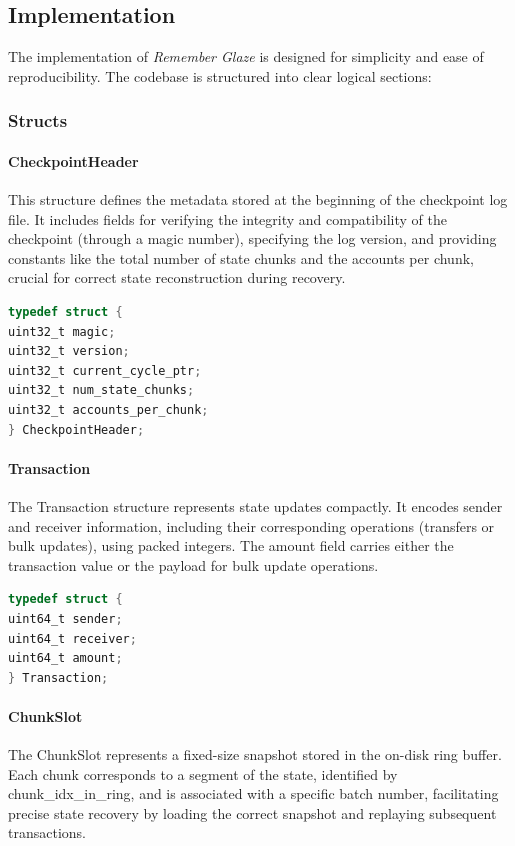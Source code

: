 \documentclass[conference]{IEEEtran}
\begin{document}
\subsection{Implementation}

The implementation of \textit{Remember Glaze} is designed for simplicity and ease of reproducibility. The codebase is structured into clear logical sections: 
\subsubsection{Structs}

\paragraph{CheckpointHeader}
This structure defines the metadata stored at the beginning of the checkpoint log file. It includes fields for verifying the integrity and compatibility of the checkpoint (through a magic number), specifying the log version, and providing constants like the total number of state chunks and the accounts per chunk, crucial for correct state reconstruction during recovery.

\begin{lstlisting}[language=C]
typedef struct {
uint32_t magic;
uint32_t version;
uint32_t current_cycle_ptr;
uint32_t num_state_chunks;
uint32_t accounts_per_chunk;
} CheckpointHeader;
\end{lstlisting}

\paragraph{Transaction}
The Transaction structure represents state updates compactly. It encodes sender and receiver information, including their corresponding operations (transfers or bulk updates), using packed integers. The amount field carries either the transaction value or the payload for bulk update operations.

\begin{lstlisting}[language=C]
typedef struct {
uint64_t sender;
uint64_t receiver;
uint64_t amount;
} Transaction;
\end{lstlisting}

\paragraph{ChunkSlot}
The ChunkSlot represents a fixed-size snapshot stored in the on-disk ring buffer. Each chunk corresponds to a segment of the state, identified by chunk\_idx\_in\_ring, and is associated with a specific batch number, facilitating precise state recovery by loading the correct snapshot and replaying subsequent transactions.
\end{document}
